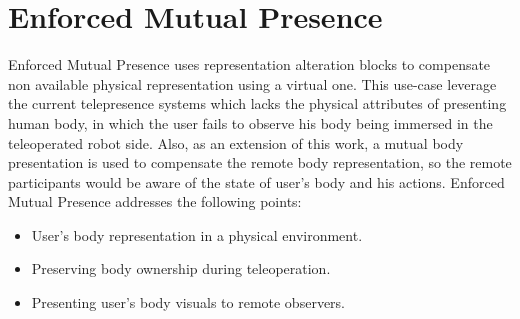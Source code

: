 

\section{Enforced Mutual Presence} 
\label{sec:eval-enforced}

Enforced Mutual Presence uses representation alteration blocks to compensate non available physical representation using a virtual one. This use-case leverage the current telepresence systems which lacks the physical attributes of presenting human body, in which the user fails to observe his body being immersed in the teleoperated robot side. Also, as an extension of this work, a mutual body presentation is used to compensate the remote body representation, so the remote participants would be aware of the state of user's body and his actions. Enforced Mutual Presence addresses the following points:
\begin{itemize}
\item User’s body representation in a physical environment.
\item Preserving body ownership during teleoperation.
\item Presenting user’s body visuals to remote observers.
\end{itemize}




